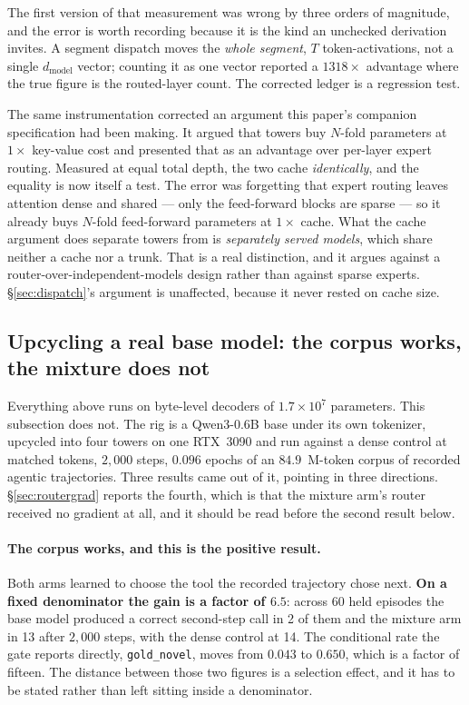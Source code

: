 \documentclass[11pt]{article}
\begin{document}
The first version of that measurement was wrong by three orders of magnitude, and the error is worth recording because it is the kind an unchecked derivation invites. A segment dispatch moves the \emph{whole segment}, $T$ token-activations, not a single $d_{\mathrm{model}}$ vector; counting it as one vector reported a $1318\times$ advantage where the true figure is the routed-layer count. The corrected ledger is a regression test.

The same instrumentation corrected an argument this paper's companion specification had been making. It argued that towers buy $N$-fold parameters at $1\times$ key-value cost and presented that as an advantage over per-layer expert routing. Measured at equal total depth, the two cache \emph{identically}, and the equality is now itself a test. The error was forgetting that expert routing leaves attention dense and shared --- only the feed-forward blocks are sparse --- so it already buys $N$-fold feed-forward parameters at $1\times$ cache. What the cache argument does separate towers from is \emph{separately served models}, which share neither a cache nor a trunk. That is a real distinction, and it argues against a router-over-independent-models design rather than against sparse experts. \S\ref{sec:dispatch}'s argument is unaffected, because it never rested on cache size.

\subsection{Upcycling a real base model: the corpus works, the mixture does not}
\label{sec:upcycle}

Everything above runs on byte-level decoders of $1.7\times10^{7}$ parameters. This subsection does not. The rig is a Qwen3-0.6B base under its own tokenizer, upcycled into four towers on one RTX~3090 and run against a dense control at matched tokens, $2{,}000$ steps, $0.096$ epochs of an $84.9$~M-token corpus of recorded agentic trajectories. Three results came out of it, pointing in three directions. \S\ref{sec:routergrad} reports the fourth, which is that the mixture arm's router received no gradient at all, and it should be read before the second result below.

\paragraph{The corpus works, and this is the positive result.} Both arms learned to choose the tool the recorded trajectory chose next. \textbf{On a fixed denominator the gain is a factor of $6.5$}: across 60 held episodes the base model produced a correct second-step call in 2 of them and the mixture arm in 13 after $2{,}000$ steps, with the dense control at 14. The conditional rate the gate reports directly, \texttt{gold\_novel}, moves from $0.043$ to $0.650$, which is a factor of fifteen. The distance between those two figures is a selection effect, and it has to be stated rather than left sitting inside a denominator.
\end{document}
